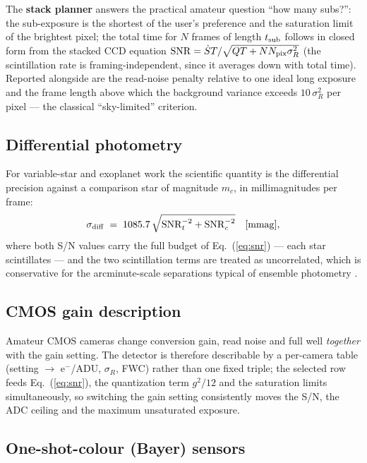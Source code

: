 The \textbf{stack planner} answers the practical amateur question ``how
many subs?'': the sub-exposure is the shortest of the user's preference
and the saturation limit of the brightest pixel; the total time for $N$
frames of length $t_{\rm sub}$ follows in closed form from the stacked
CCD equation $\mathrm{SNR} = \dot S T/\sqrt{QT + N N_{\rm pix}\sigma_R^2}$
(the scintillation rate is framing-independent, since it averages down
with total time). Reported alongside are the read-noise penalty relative
to one ideal long exposure and the frame length above which the background
variance exceeds $10\,\sigma_R^2$ per pixel — the classical
``sky-limited'' criterion.

\subsection{Differential photometry}
\label{sec:differential}

For variable-star and exoplanet work the scientific quantity is the
differential precision against a comparison star of magnitude $m_c$, in
millimagnitudes per frame:
\begin{equation}
  \sigma_{\rm diff} \;=\; 1085.7\,
  \sqrt{\mathrm{SNR}_t^{-2} + \mathrm{SNR}_c^{-2}} \quad [\mathrm{mmag}],
\end{equation}
where both S/N values carry the full budget of Eq.~(\ref{eq:snr}) — each
star scintillates — and the two scintillation terms are treated as
uncorrelated, which is conservative for the arcminute-scale separations
typical of ensemble photometry \citep{osborn2015}.

\subsection{CMOS gain description}

Amateur CMOS cameras change conversion gain, read noise and full well
\emph{together} with the gain setting. The detector is therefore
describable by a per-camera table (setting $\rightarrow$ e$^-$/ADU,
$\sigma_R$, FWC) rather than one fixed triple; the selected row feeds
Eq.~(\ref{eq:snr}), the quantization term $g^2/12$ and the saturation
limits simultaneously, so switching the gain setting consistently moves
the S/N, the ADC ceiling and the maximum unsaturated exposure.

\subsection{One-shot-colour (Bayer) sensors}
\label{sec:osc}

